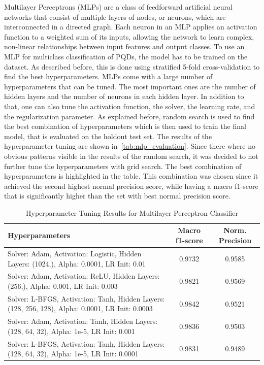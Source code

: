 Multilayer Perceptrons (MLPs) are a class of feedforward artificial neural networks that consist of multiple layers of nodes, or neurons, which are interconnected in a directed graph. Each neuron in an MLP applies an activation function to a weighted sum of its inputs, allowing the network to learn complex, non-linear relationships between input features and output classes. To use an MLP for multiclass classification of PQDs, the model has to be trained on the dataset. As described before, this is done using stratified 5-fold cross-validation to find the best hyperparameters. MLPs come with a large number of hyperparameters that can be tuned. The most important ones are the number of hidden layers and the number of neurons in each hidden layer. In addition to that, one can also tune the activation function, the solver, the learning rate, and the regularization parameter. As explained before, random search is used to find the best combination of hyperparameters which is then used to train the final model, that is evaluated on the holdout test set. The results of the hyperparameter tuning are shown in~\autoref{tab:mlp_evaluation}. Since there where no obvious patterns visible in the results of the random search, it was decided to not further tune the hyperparameters with grid search. The best combination of hyperparameters is highlighted in the table. This combination was chosen since it achieved the second highest normal precision score, while having a macro f1-score that is significantly higher than the set with best normal precision score.

\begin{table}[htbp]
\caption{Hyperparameter Tuning Results for Multilayer Perceptron Classifier}
\label{tab:mlp_evaluation}
\centering
\small
\begin{tabularx}{\linewidth}{>{\raggedright\arraybackslash}X c c}
\hline
\hline
\textbf{Hyperparameters} & \textbf{Macro f1-score} & \textbf{Norm. Precision} \\
\hline
Solver: Adam, Activation: Logistic, Hidden Layers: (1024,), Alpha: 0.0001, LR Init: 0.01 & 0.9732 & 0.9585 \\
\rowcolor{highlightRow}
Solver: Adam, Activation: ReLU, Hidden Layers: (256,), Alpha: 0.001, LR Init: 0.003 & 0.9821 & 0.9569 \\
Solver: L-BFGS, Activation: Tanh, Hidden Layers: (128, 256, 128), Alpha: 0.0001, LR Init: 0.0003 & 0.9842 & 0.9521 \\
Solver: Adam, Activation: Tanh, Hidden Layers: (128, 64, 32), Alpha: 1e-5, LR Init: 0.001 & 0.9836 & 0.9503 \\
Solver: L-BFGS, Activation: Tanh, Hidden Layers: (128, 64, 32), Alpha: 1e-5, LR Init: 0.0001 & 0.9831 & 0.9489 \\
\hline
\hline
\end{tabularx}
\end{table}


